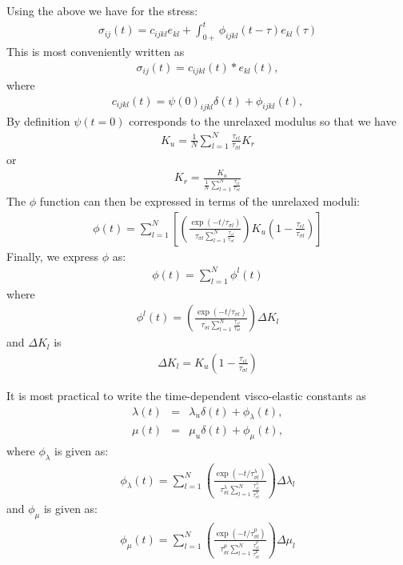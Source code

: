 \documentclass[11pt]{article}
\begin{document}
Using the above we have for the stress:
\begin{eqnarray}
\sigma_{ij}(t)=c_{ijkl}e_{kl} +\int_{0+}^t \phi_{ijkl}(t-\tau)e_{kl}(\tau)
\end{eqnarray}
This is most conveniently written as
\begin{eqnarray}
\sigma_{ij}(t)=c_{ijkl}(t)*e_{kl}(t),
\end{eqnarray}
where
\begin{eqnarray}
 c_{ijkl}(t)=\psi(0)_{ijkl}\delta(t) +\phi_{ijkl}(t),
\end{eqnarray}
%
By definition $\psi(t=0)$ corresponds to the unrelaxed modulus so that we have
\begin{eqnarray}
K_u = \frac{1}{N}\sum_{l=1}^N \frac{\tau_{\epsilon l}}{\tau_{\sigma l}} K_r
\end{eqnarray}
or
\begin{eqnarray}
K_r = \frac{K_u}{\frac{1}{N}\sum_{l=1}^N \frac{\tau_{\epsilon l}}{\tau_{\sigma l}}}
\end{eqnarray}
The $\phi$ function can then be expressed in terms of the unrelaxed moduli:
\begin{eqnarray}
\phi(t) =   
  \sum_{l=1}^N\left[\left(\frac{\exp(-t/\tau_{\sigma l})}{\tau_{\sigma l}\sum_{l=1}^N \frac{\tau_{\epsilon l}}{\tau_{\sigma l}}}\right)
            K_u\left(1-\frac{\tau_{\epsilon l}}{\tau_{\sigma l}}\right)\right]
\end{eqnarray}
Finally, we express $\phi$ as:
\begin{eqnarray}
\phi(t) = \sum_{l=1}^N \phi^l(t)
\end{eqnarray}
where
\begin{eqnarray}
\phi^l(t) = 
  \left(\frac{\exp(-t/\tau_{\sigma l})}{\tau_{\sigma l}\sum_{l=1}^N \frac{\tau_{\epsilon l}}{\tau_{\sigma l}}}\right)
            \Delta K_l
\end{eqnarray}
and $\Delta K_l$ is
\begin{eqnarray}
\Delta K_l = K_u\left(1-\frac{\tau_{\epsilon l}}{\tau_{\sigma l}}\right)
\end{eqnarray}

It is most practical to write the time-dependent visco-elastic constants as
\begin{eqnarray}
  \lambda(t) & = & \lambda_u \delta(t) + \phi_{\lambda}(t), \\
  \mu(t)    &  =  &\mu_u\delta(t)+\phi_{\mu}(t),
\end{eqnarray}
where
%
$\phi_{\lambda}$ is given as:
\begin{eqnarray}
  \phi_{\lambda}(t) = \sum_{l=1}^N 
  \left(\frac{\exp(-t/\tau^{\lambda}_{\sigma l})}{\tau^{\lambda}_{\sigma l}\sum_{l=1}^N \frac{\tau^{\lambda}_{\epsilon l}}{\tau^{\lambda}_{\sigma l}}}\right)
            \Delta \lambda_l
\end{eqnarray}
%
and $\phi_{\mu}$ is given as:
\begin{eqnarray}
  \phi_{\mu}(t) = \sum_{l=1}^N 
  \left(\frac{\exp(-t/\tau^{\mu}_{\sigma l})}{\tau^{\mu}_{\sigma l}\sum_{l=1}^N \frac{\tau^{\mu}_{\epsilon l}}{\tau^{\mu}_{\sigma l}}}\right)
            \Delta \mu_l
\end{eqnarray}
\end{document}
